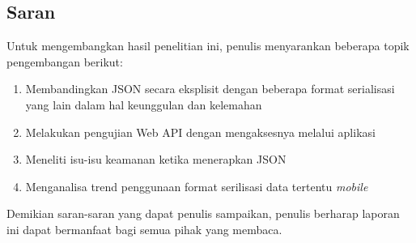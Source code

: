\documentclass{llncs}
\begin{document}
\subsection{Saran}

Untuk mengembangkan hasil penelitian ini, penulis menyarankan beberapa topik pengembangan berikut:

\begin{enumerate}
  \item Membandingkan JSON secara eksplisit dengan beberapa format serialisasi yang lain dalam hal keunggulan dan kelemahan
  \item Melakukan pengujian Web API dengan mengaksesnya melalui aplikasi
  \item Meneliti isu-isu keamanan ketika menerapkan JSON
  \item Menganalisa trend penggunaan format serilisasi data tertentu  
  \textit{mobile}
\end{enumerate}

Demikian saran-saran yang dapat penulis sampaikan, penulis berharap laporan ini dapat bermanfaat bagi semua pihak yang membaca.



%
%
\end{document}
